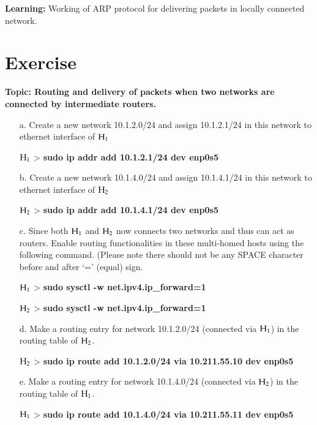 \begin{multicols}{2}
\vspace{-.5cm}

\textbf{Learning:} Working of ARP protocol for delivering packets in locally connected network.

\vspace{-.5cm}

\section*{Exercise \label{chap2-exe2}}

\textbf{Topic: Routing and delivery of packets when two networks are connected by intermediate routers.}

\begin{itemize}
\item[a.] Create a new network 10.1.2.0/24 and assign 10.1.2.1/24 in this network to ethernet interface of ${\rm H}_{1}$

${\rm H}_{1}$ > \textbf{sudo ip addr add 10.1.2.1/24 dev enp0s5}

\item[b.] Create a new network 10.1.4.0/24 and assign 10.1.4.1/24 in this network to ethernet interface of ${\rm H}_{2}$

${\rm H}_{2}$ > \textbf{sudo ip addr add 10.1.4.1/24 dev enp0s5}

\item[c.] Since both ${\rm H}_{1}$ and ${\rm H}_{2}$ now connects two networks and thus can act as routers. Enable routing functionalities in these multi-homed hosts using the following command. (Please note there should not be any SPACE character before and after ‘=’ (equal) sign.

${\rm H}_{1}$ > \textbf{sudo sysctl -w net.ipv4.ip\_forward=1}

${\rm H}_{2}$ > \textbf{sudo sysctl -w net.ipv4.ip\_forward=1}

\item[d.] Make a routing entry for network 10.1.2.0/24 (connected via ${\rm H}_{1}$) in the routing table of ${\rm H}_{2}$.

${\rm H}_{2}$ > \textbf{sudo ip route add 10.1.2.0/24 via 10.211.55.10 dev enp0s5}

\item[e.] Make a routing entry for network 10.1.4.0/24 (connected via ${\rm H}_{2}$) in the routing table of ${\rm H}_{1}$.

${\rm H}_{1}$ > \textbf{sudo ip route add 10.1.4.0/24 via 10.211.55.11 dev enp0s5}


\end{itemize}
\end{multicols}
